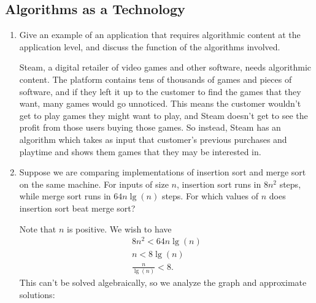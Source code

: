 \documentclass[Chapter01]{subfiles}
\begin{document}
	\subsection{Algorithms as a Technology}

	\begin{enumerate}
		\item Give an example of an application that requires algorithmic content at the application level, and discuss the function of the algorithms involved.
		\begin{answer}
			Steam, a digital retailer of video games and other software, needs algorithmic content. The platform contains tens of thousands of games and pieces of software, and if they left it up to the customer to find the games that they want, many games would go unnoticed. This means the customer wouldn't get to play games they might want to play, and Steam doesn't get to see the profit from those users buying those games. So instead, Steam has an algorithm which takes as input that customer's previous purchases and playtime and shows them games that they may be interested in.
		\end{answer}

		\item Suppose we are comparing implementations of insertion sort and merge sort on the same machine. For inputs of size $n$, insertion sort runs in $8n^2$ steps, while merge sort runs in $64n \lg(n)$ steps. For which values of $n$ does insertion sort beat merge sort?
		\begin{answer}
			Note that $n$ is positive. We wish to have
			\begin{align*}
				8n^2 < 64n \lg(n) \tag*{$\impliedby$}\\
				n < 8 \lg(n) \tag*{$\impliedby$}\\
				\frac{n}{\lg(n)} < 8.
			\end{align*}
			This can't be solved algebraically, so we analyze the graph and approximate solutions:
			\begin{figure}[h]
				\centering
			\end{figure}


\end{answer}
\end{enumerate}
\end{document}
